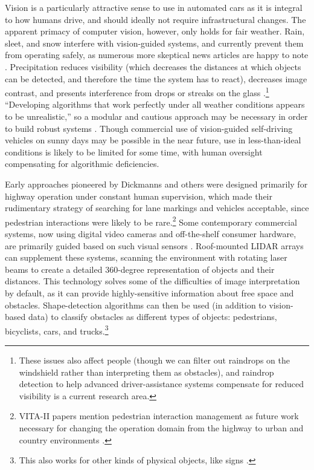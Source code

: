 Vision is a particularly attractive sense to use in automated cars
as it is integral to how humans drive, and should ideally not
require infrastructural changes. The apparent primacy of computer
vision, however, only holds for fair 
weather. Rain, sleet, and 
snow interfere with vision-guided systems, and currently prevent them
from operating safely, as numerous more skeptical news articles are
happy to note \cite{knightFurther} \cite{gomesObstacles}.
Precipitation reduces visibility (which decreases
the distances at which objects can be detected, and therefore the
time the system has to react), decreases image
contrast, and presents interference from drops or
streaks on the glass
\cite{rainADAS}.\footnote{These issues also 
affect people (though we can filter out raindrops on the
windshield rather than interpreting them as obstacles), and raindrop
detection to help advanced driver-assistance systems compensate for
reduced visibility is a current research area.} 
``Developing algorithms that work perfectly
under all weather conditions appears to be unrealistic,'' so a
modular and cautious approach may be necessary in order to build
robust systems \cite[p. 50]{rainADAS}. Though commercial use of
vision-guided self-driving vehicles on 
sunny days may be possible in the near future, use in
less-than-ideal conditions is likely to be limited for some time,
with human oversight compensating for algorithmic deficiencies. 



Early approaches pioneered by
Dickmanns and others were designed primarily for 
highway operation under constant human supervision, which made their
rudimentary strategy of searching for lane markings and vehicles
acceptable, since pedestrian interactions were likely to be
rare.\footnote{VITA-II papers mention pedestrian
  interaction management as future work necessary for changing the
  operation domain from the highway to urban and country environments \cite{ulmerVITA-II}.}
Some contemporary commercial systems, now using digital video cameras
and off-the-shelf consumer hardware, are primarily guided based on
such visual sensors \cite{makingBertha}. Roof-mounted
LIDAR arrays can supplement
these systems, scanning the environment with 
rotating laser beams to create a detailed 360-degree
representation of objects and their distances. This technology
solves some of the difficulties of image interpretation by default, as
it can provide highly-sensitive information about free space and
obstacles. Shape-detection algorithms can then be used (in addition to
vision-based data) to classify obstacles as different types of
objects: pedestrians, bicyclists, cars, and trucks.\footnote{This also
  works for other kinds of physical objects, like signs \cite{fukuda}.}


